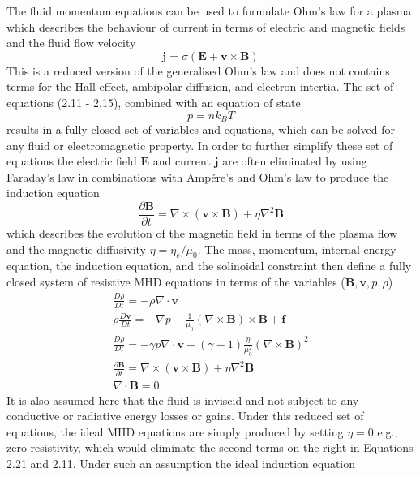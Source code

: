 The fluid momentum equations can be used to formulate Ohm's law for a plasma which describes the behaviour of current in terms of electric and magnetic fields and the fluid flow velocity
\begin{equation}
\mathbf{j} = \sigma(\mathbf{E} + \mathbf{v}\times \mathbf{B})
\end{equation}
This is a reduced version of the generalised Ohm's law and does not contains terms for the Hall effect, ambipolar diffusion, and electron intertia. The set of equations (2.11 - 2.15), combined with an equation of state 
\begin{equation}
p = nk_BT
\end{equation}
results in a fully closed set of variables and equations, which can be solved for any fluid or electromagnetic property. In order to further simplify these set of equations the electric field $\mathbf{E}$ and current $\mathbf{j}$ are often eliminated by using Faraday's law in combinations with Amp\'{e}re's and Ohm's law to produce the induction equation
\begin{equation}
\frac{\partial \mathbf{B}}{\partial t} = \nabla \times(\mathbf{v}\times \mathbf{B}) + \eta\nabla^2 \mathbf{B}
\end{equation}
which describes the evolution of the magnetic field in terms of the plasma flow and the magnetic diffusivity $\eta = \eta_e/\mu_0$.  The mass, momentum, internal energy equation, the induction equation, and the solinoidal constraint then define  a fully closed system of resistive MHD equations in terms of the variables ($\mathbf{B}, \mathbf{v}, p, \rho$)
\begin{eqnarray}
\frac{D\rho}{Dt} = -\rho\nabla\cdot \mathbf{v} \\
\rho\frac{D\mathbf{v}}{Dt}=-\nabla p + \frac{1}{\mu_0}(\nabla \times \mathbf{B})\times \mathbf{B} + \mathbf{f} \\
\frac{D\rho}{Dt} = -\gamma p\nabla\cdot \mathbf{v} +(\gamma -1)\frac{\eta}{\mu_0^2} (\nabla \times \mathbf{B})^2 \\
\frac{\partial \mathbf{B}}{\partial t} = \nabla \times(\mathbf{v}\times \mathbf{B}) + \eta\nabla^2 \mathbf{B} \\
\nabla\cdot \mathbf{B} = 0
\end{eqnarray}
It is also assumed here that the fluid is inviscid and not subject to any conductive or radiative energy losses or gains. Under this reduced set of equations, the ideal MHD equations are simply produced by setting $\eta = 0$ e.g., zero resistivity, which would eliminate the second terms on the right in Equations 2.21 and 2.11. Under such an assumption the ideal induction equation
